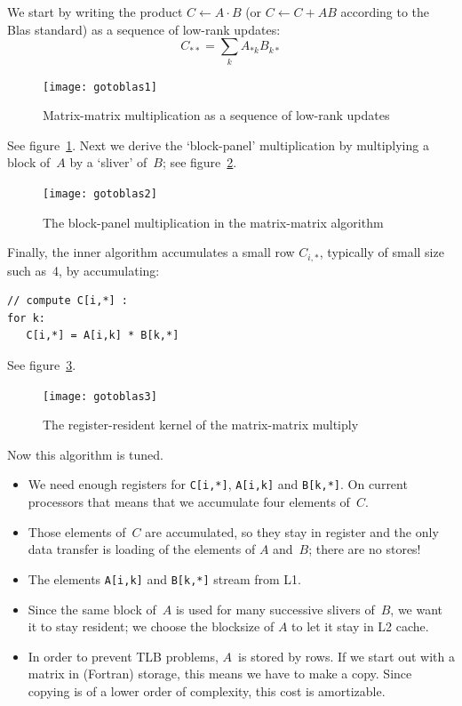 We start by writing the product $C\leftarrow A\cdot B$ (or
  $C\leftarrow C+AB$ according to the Blas standard) as a sequence of
  low-rank updates:
\[ C_{**} = \sum_k  A_{*k}B_{k*} \]
\begin{figure}[ht]
\texttt{[image: gotoblas1]}
\caption{Matrix-matrix multiplication as a sequence of low-rank updates}
\label{fig:goto1}
\end{figure}
See figure~\ref{fig:goto1}. Next we derive the `block-panel' multiplication
by multiplying a block of~$A$ by a `sliver' of~$B$; see figure~\ref{fig:goto2}.
\begin{figure}[ht]
\texttt{[image: gotoblas2]}  
\caption{The block-panel multiplication in the matrix-matrix algorithm}
\label{fig:goto2}
\end{figure}
Finally, the inner algorithm accumulates a small row $C_{i,*}$,
typically of small size such as~4, by accumulating:
\begin{verbatim}
// compute C[i,*] :
for k:
   C[i,*] = A[i,k] * B[k,*]
\end{verbatim}
See figure~\ref{fig:goto3}.
\begin{figure}[ht]
\texttt{[image: gotoblas3]}
\caption{The register-resident kernel of the matrix-matrix multiply}
\label{fig:goto3}
\end{figure}
Now this algorithm is tuned.
\begin{itemize}
\item We need enough registers for \verb+C[i,*]+, \verb+A[i,k]+ and
  \verb+B[k,*]+. On current processors that means that we accumulate
  four elements of~$C$.
\item Those elements of~$C$ are accumulated, so they stay in register
  and the only data transfer is loading of the elements of $A$
  and~$B$; there are no stores!
\item The elements \verb+A[i,k]+ and \verb+B[k,*]+ stream from L1.
\item Since the same block of~$A$ is used for many successive slivers
  of~$B$, we want it to stay resident; we choose the blocksize of $A$
  to let it stay in L2 cache.
\item In order to prevent TLB problems, $A$~is stored by rows. If we
  start out with a matrix in (Fortran) 
  storage, this means we have to make a copy. Since copying is of a
  lower order of complexity, this cost is amortizable.
\end{itemize}


